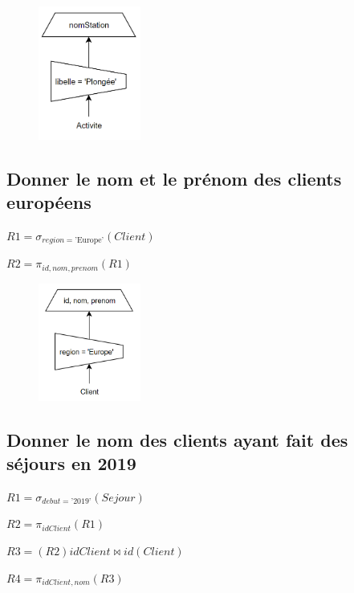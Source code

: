 \documentclass{article}
\begin{document}
\begin{figure}[H]
  \centering
  \includegraphics[width=0.3\textwidth]{imgAlgGraph/8.png}
  \label{fig:8}
\end{figure}

\subsection{Donner le nom et le prénom des clients européens}

$ R1 = \sigma_{region = \text{'Europe'}}(Client)$

$ R2 = \pi_{id, nom, prenom}(R1)$

\begin{figure}[H]
  \centering
  \includegraphics[width=0.3\textwidth]{imgAlgGraph/9.png}
  \label{fig:9}
\end{figure}

\subsection{Donner le nom des clients ayant fait des séjours en 2019}

$ R1 = \sigma_{debut = \text{'2019'}}(Sejour)$

$ R2 = \pi_{idClient}(R1)$

$ R3 = (R2)idClient \Join id(Client)$

$ R4 = \pi_{idClient, nom}(R3)$
\end{document}
